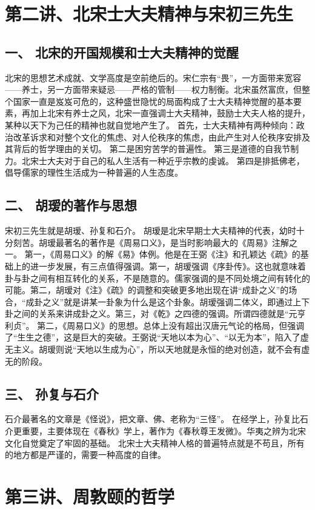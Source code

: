 \documentclass{article}
\begin{document}
\section{第二讲、北宋士大夫精神与宋初三先生}
\subsection{一、	北宋的开国规模和士大夫精神的觉醒}
北宋的思想艺术成就、文学高度是空前绝后的。宋仁宗有“畏”，一方面带来宽容——养士，另一方面带来疑忌——严格的管制——权力制衡。北宋虽然富庶，但整个国家一直是岌岌可危的，这种盛世隐忧的局面构成了士大夫精神觉醒的基本要素，再加上北宋有养士之风，北宋一直强调士大夫精神，鼓励士大夫人格的提升，某种以天下为己任的精神也就自觉地产生了。
首先，士大夫精神有两种倾向：政治改革诉求和对整个文化的焦虑、对人伦秩序的焦虑，由此产生对人伦秩序安排及其背后的哲学理由的关切。
第二是困穷苦学的普遍性。
第三是道德的自我节制力。北宋士大夫对于自己的私人生活有一种近乎宗教的虔诚。
第四是排抵佛老，倡导儒家的理性生活成为一种普遍的人生态度。
\subsection{二、	胡瑷的著作与思想}
宋初三先生就是胡瑷、孙复和石介。
胡瑷是北宋早期士大夫精神的代表，幼时十分刻苦。胡瑷最著名的著作是《周易口义》，是当时影响最大的《周易》注解之一。
第一，《周易口义》的解《易》体例。他是在王弼《注》和孔颖达《疏》的基础上的进一步发展，有三点值得强调。第一，胡瑷强调《序卦传》。这也就意味着卦与卦之间有相互转化的关系，不是随意的。儒家强调的是不同处境之间有转化的可能。第二，胡瑷对《注》《疏》的调整和突破更多地出现在讲“成卦之义”的场合，“成卦之义”就是讲某一卦象为什么是这个卦象。胡瑷强调二体义，即通过上下卦之间的关系来讲成卦之义。第三，对《乾》之四德的强调。所谓四德就是“元亨利贞”。
第二，《周易口义》的思想。总体上没有超出汉唐元气论的格局，但强调了“生生之德”，这是巨大的突破。王弼说“天地以本为心”、“以无为本”，陷入了虚无主义。胡瑷则说“天地以生成为心”，所以天地就是永恒的绝对创造，就不会有虚无的阶段。
\subsection{三、	孙复与石介}
石介最著名的文章是《怪说》，把文章、佛、老称为“三怪”。
在经学上，孙复比石介更重要，主要体现在《春秋》学上，著作为《春秋尊王发微》。华夷之辨为北宋文化自觉奠定了牢固的基础。
北宋士大夫精神人格的普遍特点就是不苟且，所有的地方都是严谨的，需要一种高度的自律。

\section{第三讲、周敦颐的哲学}
\end{document}
